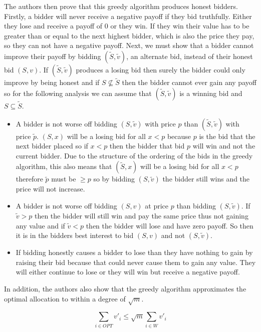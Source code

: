 \documentclass[10pt,onecolumn,letterpaper]{article}
\theoremstyle{definition}
\begin{document}
The authors then prove that this greedy algorithm produces honest bidders. Firstly, a bidder will never receive a negative payoff if they bid truthfully. Either they lose and receive a payoff of 0 or they win. If they win their value has to be greater than or equal to the next highest bidder, which is also the price they pay, so they can not have a negative payoff. Next, we must show that a bidder cannot improve their payoff by bidding $(\tilde{S}, \tilde{v})$, an alternate bid, instead of their honest bid $(S,v)$. If $(\tilde{S}, \tilde{v})$ produces a losing bid then surely the bidder could only improve by being honest and if $S \nsubseteq \tilde{S}$ then the bidder cannot ever gain any payoff so for the following analysis we can assume that $(\tilde{S}, \tilde{v})$ is a winning bid and $S \subseteq \tilde{S}$.

\begin{itemize}
	\item A bidder is not worse off bidding $(S, \tilde{v})$ with price $p$ than $(\tilde{S}, \tilde{v})$ with price $\tilde{p}$. $(S,x)$ will be a losing bid for all $x < p$ because $p$ is the bid that the next bidder placed so if $x < p$ then the bidder that bid $p$ will win and not the current bidder. Due to the structure of the ordering of the bids in the greedy algorithm, this also means that $(\tilde{S}, x)$ will be a losing bid for all $x < p$ therefore $\tilde{p}$ must be $ \geq p$ so by bidding $(S, \tilde{v})$ the bidder still wins and the price will not increase. 
	
	\item A bidder is not worse off bidding $(S, v)$ at price $p$ than bidding $(S, \tilde{v})$. If $\tilde{v} > p$ then the bidder will still win and pay the same price thus not gaining any value and if $\tilde{v} < p$ then the bidder will lose and have zero payoff. So then it is in the bidders best interest to bid $(S,v)$ and not $(S, \tilde{v})$.

	\item If bidding honestly causes a bidder to lose than they have nothing to gain by raising their bid because that could never cause them to gain any value. They will either continue to lose or they will win but receive a negative payoff.
\end{itemize}

In addition, the authors also show that the greedy algorithm approximates the optimal allocation to within a degree of $\sqrt{m}$.

$$\sum_{i \in OPT} v'_i \leq \sqrt{m} \sum_{i \in W} v'_i $$
\end{document}
